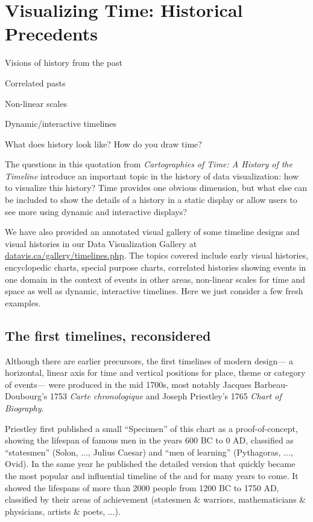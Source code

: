 \section{Visualizing Time: Historical Precedents}\label{sec:vistime}
\begin{itemize*}
  \item Visions of history from the past
  \item Correlated pasts
  \item Non-linear scales
  \item Dynamic/interactive timelines
\end{itemize*}

\epigraph{What does history look like?  How do you draw time?}{\citet[p. 10]{RosenbergGrafton:2010}}
The questions in this quotation from \emph{Cartographies of Time: A History of the Timeline} \citep{RosenbergGrafton:2010}
introduce an important topic in the history of data visualization: how to visualize this history?
Time provides one obvious dimension, but what else can be included to show the details of a history in a static display
or allow users to see more using dynamic and interactive displays?

We have also provided an annotated visual gallery of some timeline designs and visual histories
in our Data Visualization Gallery at \url{datavis.ca/gallery/timelines.php}. The topics covered
include early visual histories, encyclopedic charts, special purpose charts, correlated histories
showing events in one domain in the context of events in other areas, non-linear scales for
time and space as well as dynamic, interactive timelines.  Here we just consider a few fresh examples.

\subsection{The first timelines, reconsidered}
Although there are earlier precursors, the first timelines of modern design---
a horizontal, linear axis for time and vertical positions for place, theme or category of events---
were produced in the mid 1700s, most notably Jacques Barbeau-Doubourg's 1753
\emph{Carte chronologique} and Joseph Priestley's 1765 \emph{Chart of Biography}.

Priestley first published a small ``Specimen'' of this chart as a proof-of-concept,
showing the lifespan of famous men in the years 600 BC to 0 AD, classified as
``statesmen'' (Solon,  $\dots$, Julius Caesar) and ``men of learning'' (Pythagoras, $\dots$, Ovid).
In the same year he published the detailed version \citep{Priestley:1765}
 that quickly became the most popular
and influential timeline of the  and for many years to come.  It showed the
lifespans of more than 2000 people from 1200 BC to 1750 AD, classified by their areas
of achievement (statesmen \& warriors, mathematicians \& physicians, artists \& poets, $\dots$).

